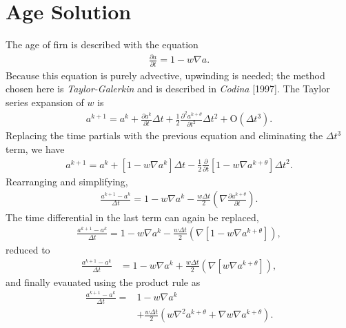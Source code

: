 \documentclass{article}%
\begin{document}
\section{Age Solution}

The age of firn is described with the equation
\begin{align*}
  \frac{\partial a}{\partial t} = 1 - w \nabla{a}.
\end{align*}
Because this equation is purely advective, upwinding is needed; the method chosen here is \emph{Taylor-Galerkin} and is described in \emph{Codina} [1997].  The Taylor series expansion of $w$ is
\begin{align*}
  a^{k+1} = a^{k} + \frac{\partial a^k}{\partial t}\Delta t + 
            \frac{1}{2}\frac{\partial^2 a^{k+\theta}}{\partial t^2}\Delta t^2 + 
            \mathrm{O} (\Delta t^3).
\end{align*}
Replacing the time partials with the previous equation and eliminating the $\Delta t^3$ term, we have
\begin{align*}
  a^{k+1} = a^{k} + \left[1 - w \nabla{a}^k \right] \Delta t
            - \frac{1}{2}\frac{\partial}{\partial t}
              \left[1 - w \nabla{a}^{k+\theta} \right] \Delta t^2. 
\end{align*}
Rearranging and simplifying,
\begin{align*}
  \frac{a^{k+1} - a^{k}}{\Delta t} = 1 - w \nabla{a}^k
        - \frac{w \Delta t}{2} 
          \left( \nabla \frac{\partial a^{k+\theta}}{\partial t} \right).
\end{align*}
The time differential in the last term can again be replaced, 
\begin{align*}
  \frac{a^{k+1} - a^{k}}{\Delta t} = 1 - w \nabla{a}^k
        - \frac{w \Delta t}{2} 
          \left( \nabla [1 - w \nabla a^{k+\theta}] \right),
\end{align*}
reduced to
\begin{align*}
  \frac{a^{k+1} - a^{k}}{\Delta t} &= 1 - w \nabla{a}^k
        + \frac{w \Delta t}{2} 
          \left( \nabla [w \nabla a^{k+\theta}] \right),
\end{align*}
and finally evauated using the product rule as
\begin{align*}
  \frac{a^{k+1} - a^{k}}{\Delta t} = &1 - w \nabla{a}^k\\
        &+ \frac{w \Delta t}{2} 
          \left( w \nabla^2 a^{k+\theta} + \nabla w \nabla a^{k+\theta} \right).
\end{align*}
\end{document}
